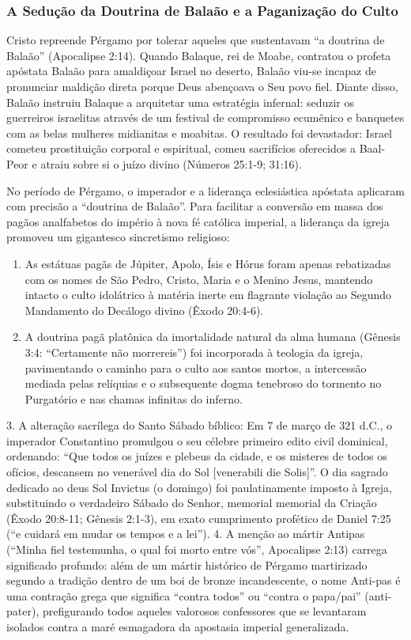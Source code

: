 \subsubsection*{A Sedução da Doutrina de Balaão e a Paganização do Culto}
Cristo repreende Pérgamo por tolerar aqueles que sustentavam ``a doutrina de Balaão'' (Apocalipse 2:14). Quando Balaque, rei de Moabe, contratou o profeta apóstata Balaão para amaldiçoar Israel no deserto, Balaão viu-se incapaz de pronunciar maldição direta porque Deus abençoava o Seu povo fiel. Diante disso, Balaão instruiu Balaque a arquitetar uma estratégia infernal: seduzir os guerreiros israelitas através de um festival de compromisso ecumênico e banquetes com as belas mulheres midianitas e moabitas. O resultado foi devastador: Israel cometeu prostituição corporal e espiritual, comeu sacrifícios oferecidos a Baal-Peor e atraiu sobre si o juízo divino (Números 25:1-9; 31:16).

No período de Pérgamo, o imperador e a liderança eclesiástica apóstata aplicaram com precisão a ``doutrina de Balaão''. Para facilitar a conversão em massa dos pagãos analfabetos do império à nova fé católica imperial, a liderança da igreja promoveu um gigantesco sincretismo religioso:
\begin{enumerate}
  \item As estátuas pagãs de Júpiter, Apolo, Ísis e Hórus foram apenas rebatizadas com os nomes de São Pedro, Cristo, Maria e o Menino Jesus, mantendo intacto o culto idolátrico à matéria inerte em flagrante violação ao Segundo Mandamento do Decálogo divino (Êxodo 20:4-6).
  \item A doutrina pagã platônica da imortalidade natural da alma humana (Gênesis 3:4: ``Certamente não morrereis'') foi incorporada à teologia da igreja, pavimentando o caminho para o culto aos santos mortos, a intercessão mediada pelas relíquias e o subsequente dogma tenebroso do tormento no Purgatório e nas chamas infinitas do inferno.
\end{enumerate}

3. A alteração sacrílega do Santo Sábado bíblico: Em 7 de março de 321 d.C., o imperador Constantino promulgou o seu célebre primeiro edito civil dominical, ordenando: ``Que todos os juízes e plebeus da cidade, e os misteres de todos os ofícios, descansem no venerável dia do Sol [venerabili die Solis]''. O dia sagrado dedicado ao deus Sol Invictus (o domingo) foi paulatinamente imposto à Igreja, substituindo o verdadeiro Sábado do Senhor, memorial memorial da Criação (Êxodo 20:8-11; Gênesis 2:1-3), em exato cumprimento profético de Daniel 7:25 (``e cuidará em mudar os tempos e a lei'').
4. A menção ao mártir Antipas (``Minha fiel testemunha, o qual foi morto entre vós'', Apocalipse 2:13) carrega significado profundo: além de um mártir histórico de Pérgamo martirizado segundo a tradição dentro de um boi de bronze incandescente, o nome Anti-pas é uma contração grega que significa ``contra todos'' ou ``contra o papa/pai'' (anti-pater), prefigurando todos aqueles valorosos confessores que se levantaram isolados contra a maré esmagadora da apostasia imperial generalizada.


